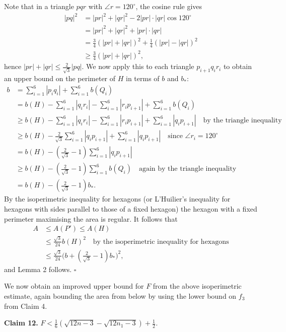 \documentclass{article}
\begin{document}
Note that in a triangle $pqr$ with $\angle r = 120^{\circ}$, the cosine rule gives 
\begin{align*}
|pq|^2 &= |pr|^2 + |qr|^2 - 2|pr|\cdot|qr|\cos 120^\circ\\
&= |pr|^2 + |qr|^2 + |pr|\cdot|qr|\\
&= \tfrac{3}{4}(|pr| + |qr|)^2 + \tfrac{1}{4}(|pr| - |qr|)^2\\
&\ge \tfrac{3}{4}(|pr| + |qr|)^2,
\end{align*} hence $|pr| + |qr| \le \frac{2}{\sqrt{3}}|pq|$. We now apply this to each triangle $p_{i + 1}q_{i}r_{i}$ to obtain an upper bound on the perimeter of $H$ in terms of $b$ and $b_{*}$: 
\begin{align*}
b &= \sum_{i=1}^{6}|p_iq_i| + \sum_{i=1}^{6} b(Q_i)\\
&= b(H) - \sum_{i=1}^{6}|q_ir_i| - \sum_{i=1}^{6}|r_ip_{i+1}| + \sum_{i=1}^{6} b(Q_i)\\
&\ge b(H) - \sum_{i=1}^{6}|q_ir_i| - \sum_{i=1}^{6}|r_ip_{i+1}| + \sum_{i=1}^{6}|q_ip_{i+1}| \quad\text{by the triangle inequality}\\
&\ge b(H) - \tfrac{2}{\sqrt{3}}\sum_{i=1}^{6}|q_ip_{i+1}| + \sum_{i=1}^{6}|q_ip_{i+1}| \quad\text{since } \angle r_i = 120^\circ\\
&= b(H) - (\tfrac{2}{\sqrt{3}} - 1)\sum_{i=1}^{6}|q_ip_{i+1}|\\
&\ge b(H) - (\tfrac{2}{\sqrt{3}} - 1)\sum_{i=1}^{6} b(Q_i) \quad\text{again by the triangle inequality}\\
&= b(H) - (\tfrac{2}{\sqrt{3}} - 1)b_*.
\end{align*} By the isoperimetric inequality for hexagons (or L’Huilier’s inequality for hexagons with sides parallel to those of a fixed hexagon) the hexagon with a fixed perimeter maximising the area is regular. It follows that 
\begin{align*}
A &\le A(P') \le A(H)\\
&\le \tfrac{\sqrt{3}}{24} b(H)^2 \quad\text{by the isoperimetric inequality for hexagons}\\
&\le \tfrac{\sqrt{3}}{24}\bigl(b + (\tfrac{2}{\sqrt{3}} - 1)b_*\bigr)^2,
\end{align*} and Lemma 2 follows. \hfill$\square$

We now obtain an improved upper bound for $F$ from the above isoperimetric estimate, again bounding the area from below by using the lower bound on $f_{3}$ from Claim 4.

\textbf{Claim 12.} $F < \frac{1}{6}(\sqrt{12n - 3} - \sqrt{12n_{1} - 3}) + \frac{1}{2}$\textit{.}
\end{document}
